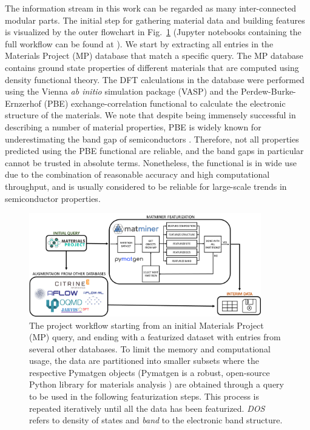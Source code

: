 \documentclass[superscriptaddress,unsortedaddress,
 amsmath,amssymb,
 aps,
]{revtex4-2}
\begin{document}
The information stream in this work can be regarded as many inter-connected modular parts. 
The initial step for gathering material data and building features is visualized by the outer flowchart in Fig.~\ref{fig:flowchart} (Jupyter notebooks containing the full
workflow can be found at \cite{Ohebbi2021}).
We start by extracting all entries in the Materials Project (MP) database  \cite{Jain2013,Jain2018} that match a specific query. 
The MP database contains ground state properties of different materials that are computed using density functional theory. The DFT calculations in the database were performed using the Vienna {\em ab initio} simulation package (VASP) \cite{Kresse1996} and the Perdew-Burke-Ernzerhof (PBE) \cite{Perdew1996} exchange-correlation functional to calculate the electronic structure of the materials. 
We note that despite being immensely successful in describing a number of material properties, PBE is widely known for underestimating the band gap of semiconductors \cite{Freysoldt2014}. Therefore, not all properties predicted using the PBE functional are reliable, and the band gaps in particular cannot be trusted in absolute terms. Nonetheless, the functional is in wide use due to the combination of reasonable accuracy and high computational throughput, and is usually considered to be reliable for large-scale trends in semiconductor properties. 

\begin{figure}[t]
    \centering
    \includegraphics[width=0.9\textwidth]{figures/flow_chart_2.png}
    \caption{The project workflow starting from an initial Materials Project (MP) query, and ending with a featurized dataset with entries from several other databases. 
    To limit the memory and computational usage, the data are partitioned into smaller subsets where the respective Pymatgen objects (Pymatgen is a robust, open-source Python library for materials analysis \cite{pymatgen}) are obtained through a query to be used in the following featurization steps. This process is repeated iteratively until all the data has been featurized. \emph{DOS} refers to density of states and \emph{band} to the electronic band structure. 
    }
    \label{fig:flowchart}
\end{figure}
\end{document}
